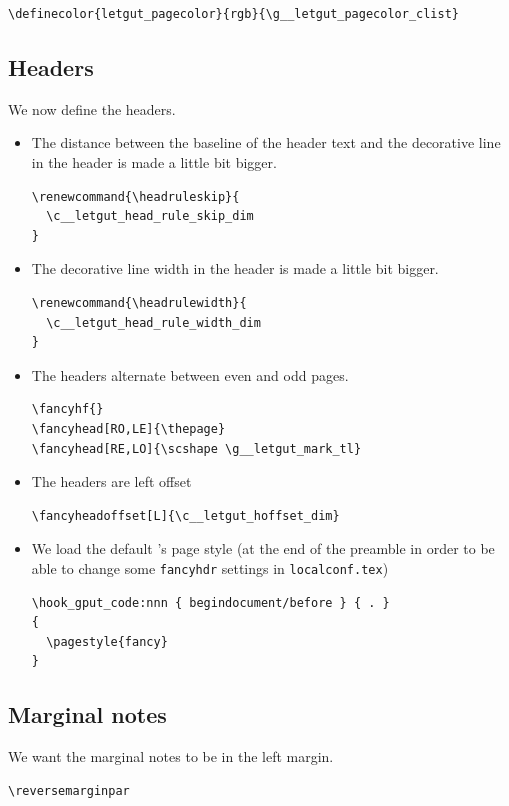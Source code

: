 \documentclass{letgut}
\begin{document}
\begin{lstlisting}
\definecolor{letgut_pagecolor}{rgb}{\g__letgut_pagecolor_clist}
\end{lstlisting}
\subsection{Headers}
\label{ImplementationHeaders-78ig55h0jlj0}
We now define the headers.

\begin{itemize}
\item The distance between the baseline of the header text and the decorative line
in the header is made a little bit bigger.
\begin{lstlisting}
\renewcommand{\headruleskip}{
  \c__letgut_head_rule_skip_dim
}
\end{lstlisting}
\item The decorative line width in the header is made a little bit bigger.
\begin{lstlisting}
\renewcommand{\headrulewidth}{
  \c__letgut_head_rule_width_dim
}
\end{lstlisting}
\item The headers alternate between even and odd pages.
\begin{lstlisting}
\fancyhf{}
\fancyhead[RO,LE]{\thepage}
\fancyhead[RE,LO]{\scshape \g__letgut_mark_tl}
\end{lstlisting}
\item The headers are left offset
\begin{lstlisting}
\fancyheadoffset[L]{\c__letgut_hoffset_dim}
\end{lstlisting}
\item We load the default 's page style (at the end of the
preamble in order to be able to change some \lstinline+fancyhdr+ settings in
\lstinline+localconf.tex+)
\begin{lstlisting}
\hook_gput_code:nnn { begindocument/before } { . }
{
  \pagestyle{fancy}
}
\end{lstlisting}
\end{itemize}
\subsection{Marginal notes}
\label{ImplementationMarginalnotes-1uig55h0jlj0}
We want the marginal notes to be in the left margin.

\begin{lstlisting}
\reversemarginpar
\end{lstlisting}
\end{document}
